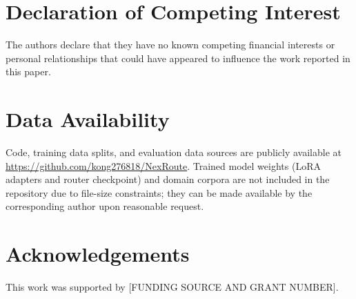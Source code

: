 \documentclass[a4paper,fleql]{cas-sc}
\begin{document}
\printcredits

\section*{Declaration of Competing Interest}
The authors declare that they have no known competing financial interests or
personal relationships that could have appeared to influence the work reported
in this paper.

\section*{Data Availability}
Code, training data splits, and evaluation data sources are publicly available
at \url{https://github.com/kong276818/NexRoute}. Trained model weights (LoRA
adapters and router checkpoint) and domain corpora are not included in the
repository due to file-size constraints; they can be made available by the
corresponding author upon reasonable request.

\section*{Acknowledgements}
This work was supported by [FUNDING SOURCE AND GRANT NUMBER].
\end{document}
